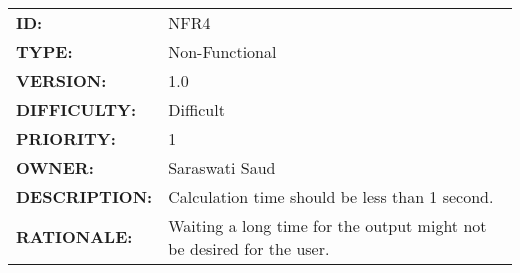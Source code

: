         \\[10pt]
        \begin{tabular}{ |p{4cm} | p{11cm}| }
            \hline
            \textbf{ID:} & NFR4\\
            \textbf{TYPE:} & Non-Functional\\
            \textbf{VERSION:} & 1.0\\
            \textbf{DIFFICULTY:} & Difficult\\
            \textbf{PRIORITY:} & 1\\
            \textbf{OWNER:} & Saraswati Saud\\
            \textbf{DESCRIPTION:} & Calculation time should be less than 1 second. \\
            \textbf{RATIONALE:} & Waiting a long time for the output might not be desired for the user. \\
            \hline
        \end{tabular}

